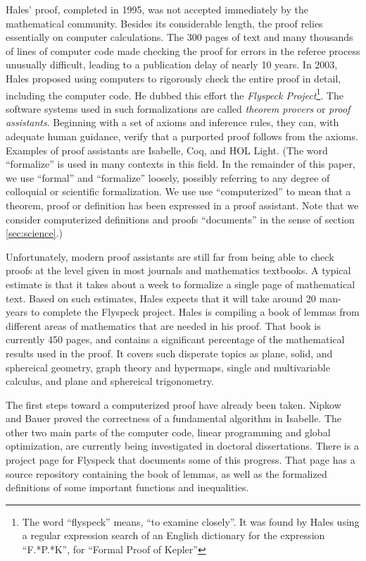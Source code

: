 Hales' proof, completed in 1995, was not accepted immediately by the
mathematical community.  Besides its considerable length, the proof relies
essentially on computer calculations.  The 300 pages of text and many thousands
of lines of computer code made checking the proof for errors in the referee
process unusually difficult, leading to a publication delay of nearly 10 years.
In 2003, Hales proposed using computers to rigorously check the entire proof in
detail, including the computer code.  He dubbed this effort the \textit{Flyspeck
  Project}\footnote{The word ``flyspeck'' means, ``to examine closely''.  It was
  found by Hales using a regular expression search of an English dictionary for
  the expression ``F.*P.*K'', for ``Formal Proof of Kepler''}.  The software
systems used in such formalizations are called \textit{theorem provers} or
\textit{proof assistants}.  Beginning with a set of axioms and inference rules,
they can, with adequate human guidance, verify that a purported proof follows
from the axioms.  Examples of proof assistants are
Isabelle\cite{Paulson:1994:Isabelle}, Coq\cite{Bertot:2004:CoqBook}, and HOL
Light\cite{Harrison:2000:HOL-Light}. (The word ``formalize'' is used in many
contexts in this field.  In the remainder of this paper, we use ``formal'' and
``formalize'' loosely, possibly referring to any degree of colloquial or
scientific formalization.  We use use ``computerized'' to mean that a theorem,
proof or definition has been expressed in a proof assistant.  Note that we
consider computerized definitions and proofs ``documents'' in the sense of
section \ref{sec:science}.)

  Unfortunately, modern proof assistants are still far from being able to check
proofs at the level given in most journals and mathematics textbooks.  A typical
estimate is that it takes about a week to formalize a single page of mathematical
text.  Based on such estimates, Hales expects that it will take 
around 20 man-years to complete the Flyspeck project.  
Hales is compiling a book\cite{Hales:2007:FlyspeckBook}
of lemmas from different areas of mathematics that are needed in his proof. 
That book is currently 450 pages, and contains a significant percentage
of the mathematical results used in the proof.  It covers such disperate topics
as plane, solid, and sphereical geometry, graph theory and hypermaps, single and
multivariable calculus, and plane and sphereical trigonometry.

The first steps toward a computerized proof have already been taken.
Nipkow and Bauer\cite{Nipkow:2005:Tame} proved the correctness of a
fundamental algorithm in Isabelle.  The other two main parts of the
computer code, linear programming and global optimization, are
currently being investigated in doctoral
dissertations\cite{Zumkeller:2006:TaylorModels,Obua:2005:LinearPrograms}.
There is a project page\cite{website:FlyspeckProjectPage} for Flyspeck
that documents some of this progress.  That page has a source
repository containing the book of lemmas, as well as the formalized
definitions of some important functions and inequalities.  

